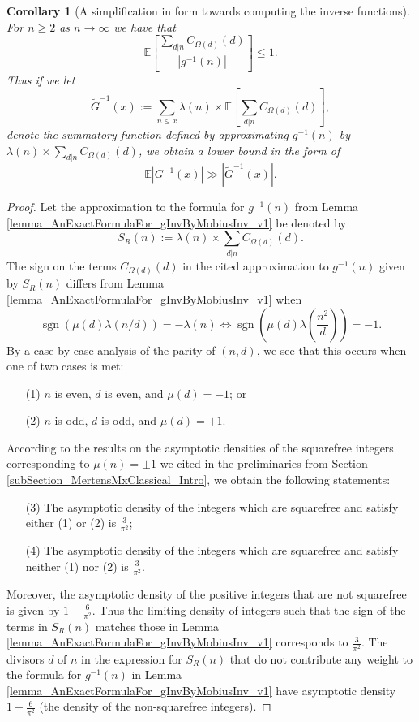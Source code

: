 \documentclass[11pt,reqno,a4letter]{article}
\numberwithin{figure}{section}
\numberwithin{table}{section}
\theoremstyle{plain}
\newtheorem{cor}[theorem]{Corollary}
\numberwithin{theorem}{section}
\theoremstyle{definition}
\begin{document}
\begin{cor}[A simplification in form towards computing the inverse functions] 
\label{cor_ComputingInvFuncs_InPractice_DivSumgInvAst1_v1} 
For $n \geq 2$ as $n \rightarrow \infty$ we have that 
\[
\mathbb{E}\left[\frac{\sum\limits_{d|n} C_{\Omega(d)}(d)}{|g^{-1}(n)|}\right] \leq 1. 
\]
Thus if we let 
\[
\widetilde{G}^{-1}(x) := \sum_{n \leq x} \lambda(n) \times \mathbb{E}\left[ 
     \sum_{d|n} C_{\Omega(d)}(d)\right], 
\]
denote the summatory function defined by approximating $g^{-1}(n)$ by 
$\lambda(n) \times \sum_{d|n} C_{\Omega(d)}(d)$, we obtain a lower bound in the form of 
$$\mathbb{E}|G^{-1}(x)| \gg \left\lvert \widetilde{G}^{-1}(x) \right\rvert.$$
\end{cor} 
\begin{proof} 
Let the approximation to the formula for $g^{-1}(n)$ from 
Lemma \ref{lemma_AnExactFormulaFor_gInvByMobiusInv_v1} be denoted by 
\[
S_R(n) := \lambda(n) \times \sum_{d|n} C_{\Omega(d)}(d). 
\]
The sign on the terms $C_{\Omega(d)}(d)$ in the cited approximation to $g^{-1}(n)$ 
given by $S_R(n)$ differs from Lemma \ref{lemma_AnExactFormulaFor_gInvByMobiusInv_v1} when 
\[
\operatorname{sgn}\left(\mu(d) \lambda(n/d)\right) = -\lambda(n) \iff 
     \operatorname{sgn}\left(\mu(d) \lambda\left(\frac{n^2}{d}\right)\right) = -1. 
\]
By a case-by-case analysis of the parity of $(n, d)$, we see that this occurs when one of two 
cases is met: 
\begin{itemize} 
\item[(1)] $n$ is even, $d$ is even, and $\mu(d) = -1$; or 
\item[(2)] $n$ is odd, $d$ is odd, and $\mu(d) = +1$. 
\end{itemize} 
According to the results on the asymptotic densities of the squarefree integers corresponding to 
$\mu(n) = \pm 1$ we cited in the preliminaries from Section \ref{subSection_MertensMxClassical_Intro}, 
we obtain the following statements: 
\begin{itemize} 
\item[(3)] The asymptotic density of the integers which are squarefree and satisfy either (1) or (2) is $\frac{3}{\pi^2}$; 
\item[(4)] The asymptotic density of the integers which are squarefree and satisfy neither (1) nor (2) is $\frac{3}{\pi^2}$. 
\end{itemize} 
Moreover, the asymptotic density of the positive integers that are not squarefree is given by 
$1 - \frac{6}{\pi^2}$. Thus the limiting density of integers such that the sign of the terms in 
$S_R(n)$ matches those in Lemma \ref{lemma_AnExactFormulaFor_gInvByMobiusInv_v1} corresponds to 
$\frac{3}{\pi^2}$. The divisors $d$ of $n$ in the expression for $S_R(n)$ that do not contribute 
any weight to the formula for $g^{-1}(n)$ in 
Lemma \ref{lemma_AnExactFormulaFor_gInvByMobiusInv_v1} have 
asymptotic density $1 - \frac{6}{\pi^2}$ (the density of the non-squarefree integers). 


\end{proof}
\end{document}
